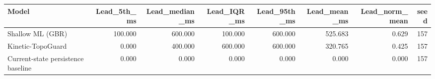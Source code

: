\begin{tabular}{lrrrrrrr}
\toprule
Model & Lead\_5th\_ms & Lead\_median\_ms & Lead\_IQR\_ms & Lead\_95th\_ms & Lead\_mean\_ms & Lead\_norm\_mean & seed \\
\midrule
Shallow ML (GBR) & 100.000 & 600.000 & 100.000 & 600.000 & 525.683 & 0.629 & 157 \\
Kinetic-TopoGuard & 0.000 & 400.000 & 600.000 & 600.000 & 320.765 & 0.425 & 157 \\
Current-state persistence baseline & 0.000 & 0.000 & 0.000 & 0.000 & 0.000 & 0.000 & 157 \\
\bottomrule
\end{tabular}